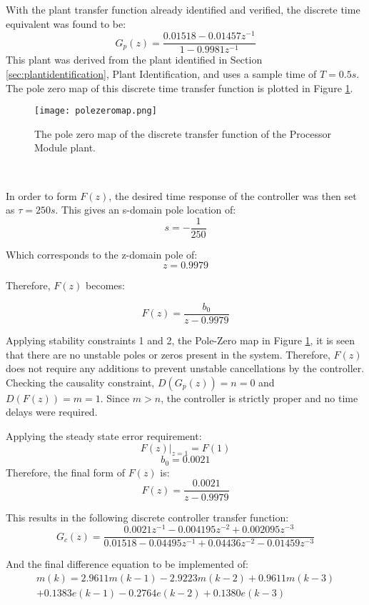 With the plant transfer function already identified and verified, the discrete time equivalent was found to be:
$$ G_p(z) = \frac{0.01518 - 0.01457z^{-1}}{1 - 0.9981z^{-1}} $$
This plant was derived from the plant identified in Section \ref{sec:plantidentification}, Plant Identification, and uses a sample time of $T=0.5s$. The pole zero map of this discrete time transfer function is plotted in Figure \ref{fig:polezeromap}.

\begin{figure}[!htb]
	\centering
	\texttt{[image: polezeromap.png]}
	\caption[Discrete Plant Transfer Function Pole Zero Map.]{The pole zero map of the discrete transfer function of the Processor Module plant.}
	\label{fig:polezeromap}
\end{figure} 
\FloatBarrier

In order to form $F(z)$, the desired time response of the controller was then set as $\tau = 250s$. This gives an s-domain pole location of:
$$s=-\frac{1}{250}$$

Which corresponds to the z-domain pole of:
$$z=0.9979$$

Therefore, $F(z)$ becomes:

$$F(z) = \frac{b_0}{z - 0.9979}$$

Applying stability constraints 1 and 2, the Pole-Zero map in Figure \ref{fig:polezeromap}, it is seen that there are no unstable poles or zeros present in the system. Therefore, $F(z)$ does not require any additions to prevent unstable cancellations by the controller.\\

Checking the causality constraint, $D(G_p(z)) = n = 0$ and $D(F(z)) = m = 1$. Since $m>n$, the controller is strictly proper and no time delays were required.

Applying the steady state error requirement:
$$F(z)|_{z=1} = F(1)$$
$$b_0 = 0.0021$$
Therefore, the final form of $F(z)$ is:
$$F(z) = \frac{0.0021}{z-0.9979}$$

This results in the following discrete controller transfer function:
$$G_c(z) = \frac{0.0021z^{-1} - 0.004195z^{-2} + 0.002095z^{-3}}{0.01518 - 0.04495z^{-1} + 0.04436z^{-2} - 0.01459z^{-3}}$$

And the final difference equation to be implemented of:
\begin{equation}
\begin{split}
	m(k) =  2.9611m(k-1) - 2.9223m(k-2) + 0.9611m(k-3)\\ + 0.1383e(k-1) - 0.2764e(k-2) + 0.1380e(k-3)
\end{split}
\end{equation}


